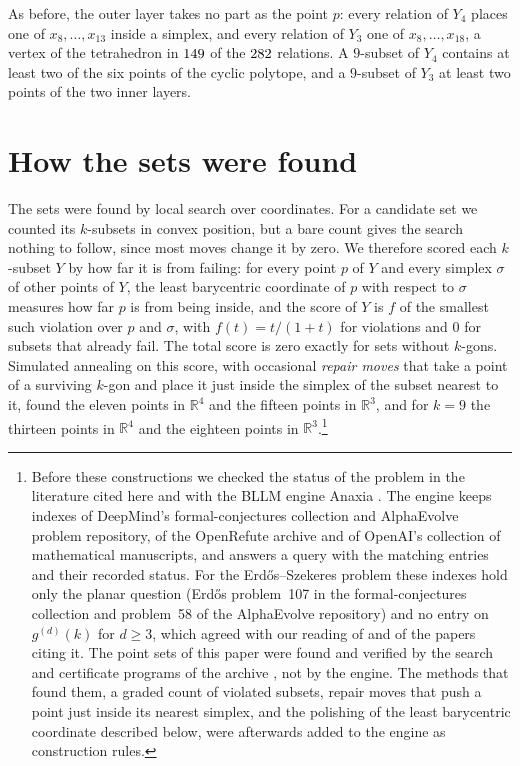 \documentclass[aps,prd,twocolumn,superscriptaddress,nofootinbib,longbibliography,floatfix,showkeys,amsmath,amssymb,10pt]{revtex4-2}
\theoremstyle{plain}
\theoremstyle{definition}
\theoremstyle{plain}
\newcommand{\R}{\mathbb{R}}
\begin{document}
As before, the outer layer takes no part as the point $p$: every relation of $Y_4$ places one of $x_8,\dots,x_{13}$ inside a simplex, and every relation of $Y_3$ one of $x_8,\dots,x_{18}$, a vertex of the tetrahedron in $149$ of the $282$ relations. A $9$-subset of $Y_4$ contains at least two of the six points of the cyclic polytope, and a $9$-subset of $Y_3$ at least two points of the two inner layers.

\section{How the sets were found}\label{sec:search}

The sets were found by local search over coordinates. For a candidate set we counted its $k$-subsets in convex position, but a bare count gives the search nothing to follow, since most moves change it by zero. We therefore scored each $k$-subset $Y$ by how far it is from failing: for every point $p$ of $Y$ and every simplex $\sigma$ of other points of $Y$, the least barycentric coordinate of $p$ with respect to $\sigma$ measures how far $p$ is from being inside, and the score of $Y$ is $f$ of the smallest such violation over $p$ and $\sigma$, with $f(t)=t/(1+t)$ for violations and $0$ for subsets that already fail. The total score is zero exactly for sets without $k$-gons. Simulated annealing on this score, with occasional \emph{repair moves} that take a point of a surviving $k$-gon and place it just inside the simplex of the subset nearest to it, found the eleven points in $\R^4$ and the fifteen points in $\R^3$, and for $k=9$ the thirteen points in $\R^4$ and the eighteen points in $\R^3$.\footnote{Before these constructions we checked the status of the problem in the literature cited here and with the BLLM engine Anaxia \cite{Ana26}. The engine keeps indexes of DeepMind's formal-conjectures collection and AlphaEvolve problem repository, of the OpenRefute archive and of OpenAI's collection of mathematical manuscripts, and answers a query with the matching entries and their recorded status. For the Erd\H{o}s--Szekeres problem these indexes hold only the planar question (Erd\H{o}s problem~107 in the formal-conjectures collection and problem~58 of the AlphaEvolve repository) and no entry on $g^{(d)}(k)$ for $d\ge3$, which agreed with our reading of \cite{Sch23} and of the papers citing it. The point sets of this paper were found and verified by the search and certificate programs of the archive \cite{BB26z}, not by the engine. The methods that found them, a graded count of violated subsets, repair moves that push a point just inside its nearest simplex, and the polishing of the least barycentric coordinate described below, were afterwards added to the engine as construction rules.}
\end{document}
